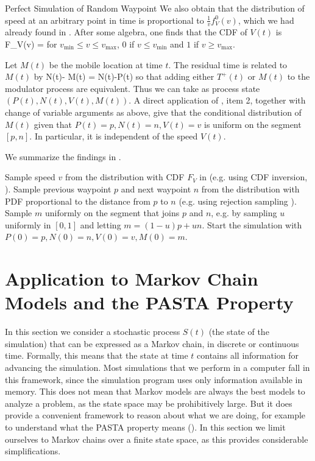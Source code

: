 \begin{ex}{Perfect Simulation of Random Waypoint}
We also obtain that the distribution of speed at an arbitrary point
in time is proportional to $\frac{1}{v}f_{V}^0(v)$, which we had
already found in . After some algebra, one finds
that the CDF of $V(t)$ is
 \be F_V(v) =
 \label{eq-CDF-FV}
 \ee
 for $v_{\min} \leq v \leq v_{\max}$, $0$ if $v \leq v_{\min}$ and
 $1$ if $v \geq v_{\max}$.


Let $M(t)$ be the mobile location at time $t$. The residual time is
related to $M(t)$ by
 \ben
 N(t)- M(t)  =  \lp N(t)-P(t)\rp
 \een so that adding either $T^+(t)$ or $M(t)$ to the modulator process
 are equivalent. Thus we can take as process state $(P(t), N(t), V(t),
 M(t))$. A direct application of , item 2, together with change of
variable arguments as above, give that the conditional
distribution of $M(t)$ given that $P(t)=p, N(t)=n, V(t)=v$ is
uniform on the segment $[p, n]$. In particular, it is
independent of the speed $V(t)$.

We summarize the findings in .
\begin{algorithm}
 \begin{algorithmic}[1]
%
  \State
  Sample speed $v$ from the distribution with CDF $F_V$ in
  (e.g. using CDF inversion, ).
    \State Sample previous waypoint $p$ and next waypoint $n$
    from the distribution with PDF proportional
  to the distance from $p$ to $n$
(e.g. using rejection sampling ).
  \State Sample $m$ uniformly on the segment
  that joins $p$ and $n$, e.g. by sampling $u$ uniformly in $[0,1]$ and
  letting $m=(1-u)p + u n$.
  \State Start the simulation with $P(0)=p, N(0)=n, V(0)=v, M(0)=m$.
\end{algorithmic}\label{algo-perfect-rwp}
 \end{algorithm}
\label{ex-palm-rwp-3}
 \end{ex}


\section{Application to Markov Chain Models and the PASTA
Property}

In this section we consider a stochastic process $S(t)$ (the
state of the simulation) that can be expressed as a Markov
chain, in discrete or continuous time. Formally, this means
that the state at time $t$ contains all information for
advancing the simulation. Most simulations that we perform in a
computer fall in this framework, since the simulation program
uses only information available in memory. This does not mean
that Markov models are always the best models to analyze a
problem, as the state space may be prohibitively large. But it
does provide a convenient framework to reason about what we are
doing, for example to understand what the PASTA property means
(). In this section we limit ourselves to
Markov chains over a finite state space, as this provides
considerable simplifications.

